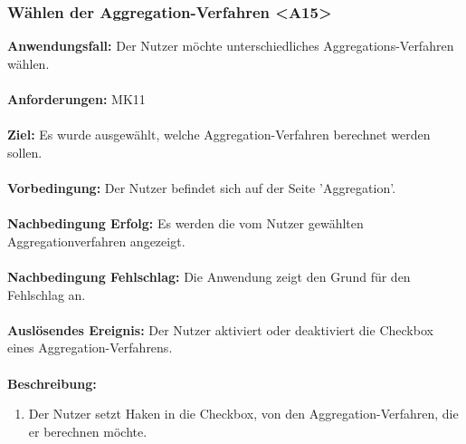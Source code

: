 \documentclass[parskip=full]{scrartcl} %
\begin{document}
\subsubsection*{Wählen der Aggregation-Verfahren <A15>}
\textbf{Anwendungsfall:} Der Nutzer möchte unterschiedliches Aggregations-Verfahren wählen.\\\\
\textbf{Anforderungen:} MK11\\\\
\textbf{Ziel:} Es wurde ausgewählt, welche Aggregation-Verfahren berechnet werden sollen.\\\\
\textbf{Vorbedingung:} Der Nutzer befindet sich auf der Seite 'Aggregation'.\\\\
\textbf{Nachbedingung Erfolg:} Es werden die vom Nutzer gewählten Aggregationverfahren angezeigt.\\\\
\textbf{Nachbedingung Fehlschlag:} Die Anwendung zeigt den Grund für den Fehlschlag an. \\\\
\textbf{Auslösendes Ereignis:} Der Nutzer aktiviert oder deaktiviert die Checkbox eines Aggregation-Verfahrens. \\\\
\textbf{Beschreibung:}
\begin{enumerate}
    \item Der Nutzer setzt Haken in die Checkbox, von den Aggregation-Verfahren, die er berechnen möchte.
\end{enumerate}
\newpage
\end{document}
